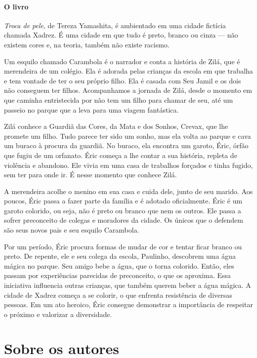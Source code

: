 \documentclass[11pt]{extarticle}
\begin{document}
\paragraph{O livro} \textit{Troca de pele}, de Tereza Yamashita, é ambientado em uma cidade fictícia chamada Xadrez. É uma cidade em que tudo é preto, branco ou cinza --- não existem cores e, na teoria, também não existe racismo. 

Um esquilo chamado Carambola é o narrador e conta a história de Zilá, que é merendeira de um colégio. Ela é adorada pelas crianças da escola em que trabalha e tem vontade de ter o seu próprio filho. Ela é casada com Seu Jamil e os dois não conseguem ter filhos.
Acompanhamos a jornada de Zilá, desde o momento em que caminha entristecida por não tem um filho para chamar de seu, até um passeio no parque que a leva para uma viagem fantástica. 

Zilá conhece a Guardiã das Cores, da Mata e dos Sonhos, Crevax, que lhe promete um filho. Tudo parece ter sido um sonho, mas ela volta ao parque e cava um buraco à procura da guardiã. No buraco, ela encontra um garoto, Éric, órfão que fugiu de um orfanato. Éric começa a lhe contar a sua história, repleta de violência e abandono. Ele vivia em uma casa de trabalhos forçados e tinha fugido, sem ter para onde ir. É nesse momento que conhece Zilá.

A merendeira acolhe o menino em sua casa e cuida dele, junto de seu marido. Aos poucos, Éric passa a fazer parte da família e é adotado oficialmente. Éric é um garoto colorido, ou seja, não é preto ou branco que nem os outros. Ele passa a sofrer preconceito de colegas e moradores da cidade. Os únicos que o defendem são seus novos pais e seu esquilo Carambola.

Por um período, Éric procura formas de mudar de cor e tentar ficar branco ou preto. De repente, ele e seu colega da escola, Paulinho, descobrem uma água mágica no parque. Seu amigo bebe a água, que o torna colorido. Então, eles passam por experiências parecidas de preconceito, o que os aproxima. Essa iniciativa influencia outras crianças, que também querem beber a água mágica. A cidade de Xadrez começa a se colorir, o que enfrenta resistência de diversas pessoas. Em um ato heroico, Éric consegue demonstrar a importância de respeitar o próximo e valorizar a diversidade.

\section{Sobre os autores}
\end{document}
